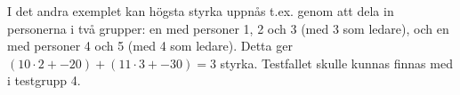 I det andra exemplet kan högsta styrka uppnås t.ex. genom att dela in personerna i två grupper:
en med personer 1, 2 och 3 (med 3 som ledare), och en med personer 4 och 5 (med 4 som ledare).
Detta ger $(10 \cdot 2 + -20) + (11 \cdot 3 + -30) = 3$ styrka.
Testfallet skulle kunnas finnas med i testgrupp 4.
